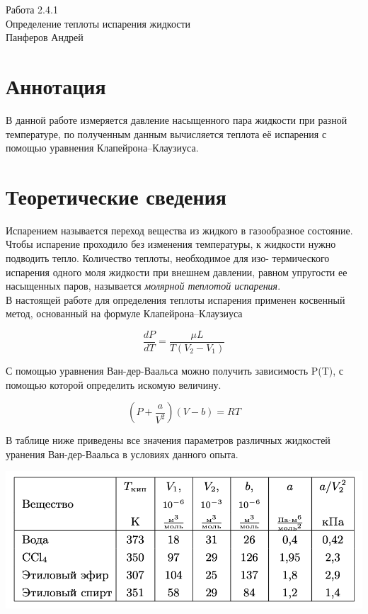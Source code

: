 



\begin{center}
  \LARGE{Работа 2.4.1}\\[0.2cm]
  \LARGE{Определение теплоты испарения жидкости}\\[0.2cm]
  \large{Панферов Андрей}\\[0.2cm]
\end{center}  
  

\section{Аннотация}

В данной работе измеряется давление насыщенного пара жидкости при разной температуре, по полученным данным вычисляется теплота её испарения с помощью уравнения Клапейрона–Клаузиуса.

\section{Теоретические сведения}
Испарением называется переход вещества из жидкого в газообразное состояние. Чтобы испарение проходило без изменения температуры, к жидкости нужно подводить тепло. Количество теплоты, необходимое для изо- термического испарения одного моля жидкости при внешнем давлении, равном упругости ее насыщенных паров, называется \textit{молярной теплотой испарения}. \\
В настоящей работе для определения теплоты испарения применен косвенный метод, основанный на формуле Клапейрона--Клаузиуса

\begin{equation*}
\frac{dP}{dT}=\frac{\mu L}{T(V_2-V_1)}
\end{equation*}

С помощью уравнения Ван-дер-Ваальса можно получить зависимость P(T), с помощью которой определить искомую величину. 

\begin{equation*}
(P+\frac{a}{V^2})(V-b)=RT
\end{equation*}

В таблице ниже приведены все значения параметров различных жидкостей уранения Ван-дер-Ваальса в условиях данного опыта. 

\begin{center}

  \includegraphics[width=0.7\linewidth]{1.jpg}\\
 
   \\
  
 \end{center}
 
